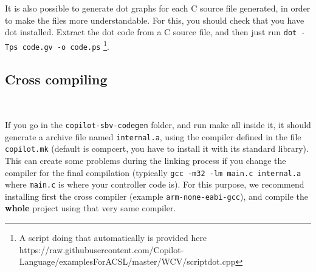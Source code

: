 It is also possible to generate dot graphs for each C source file generated, in order to make the files more understandable. For this, you should check that you have dot installed.
Extract the dot code from a C source file, and then just run \texttt{dot -Tps code.gv -o code.ps} \footnote{A script doing that automatically is provided here https://raw.githubusercontent.com/Copilot-Language/examplesForACSL/master/WCV/scriptdot.cpp}.


\subsection{Cross compiling}~\label{sec:cross} 

If you go in the \texttt{copilot-sbv-codegen} folder, and run make all inside it, it should generate a archive file named \texttt{internal.a}, using the compiler defined in the file \texttt{copilot.mk} (default is compcert, you have to install it with its standard library). This can create some problems during the linking process if you change the compiler for the final compilation (typically \texttt{gcc -m32 -lm main.c internal.a} where \texttt{main.c} is where your controller code is). For this purpose, we recommend installing first the cross compiler (example \texttt{arm-none-eabi-gcc}), and compile the \textbf{whole} project using that very same compiler. 
